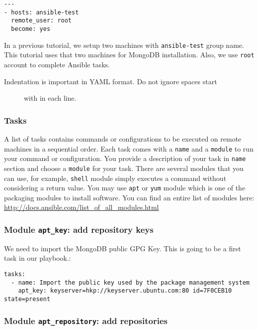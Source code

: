 \begin{verbatim}
---
- hosts: ansible-test
  remote_user: root
  become: yes
\end{verbatim}

In a previous tutorial, we setup two machines with \texttt{ansible-test}
group name. This tutorial uses that two machines for MongoDB
installation. Also, we use \texttt{root} account to complete Ansible
tasks.

\begin{description}
\item[Indentation is important in YAML format. Do not ignore spaces
start]
with in each line.
\end{description}

\subsubsection{Tasks}\label{tasks}

A list of tasks contains commands or configurations to be executed on
remote machines in a sequential order. Each task comes with a
\texttt{name} and a \texttt{module} to run your command or
configuration. You provide a description of your task in \texttt{name}
section and choose a \texttt{module} for your task. There are several
modules that you can use, for example, \texttt{shell} module simply
executes a command without considering a return value. You may use
\texttt{apt} or \texttt{yum} module which is one of the packaging
modules to install software. You can find an entire list of modules
here: \url{http://docs.ansible.com/list_of_all_modules.html}

\subsubsection{\texorpdfstring{Module \texttt{apt\_key}: add repository
keys}{Module apt\_key: add repository keys}}\label{module-apt_key-add-repository-keys}

We need to import the MongoDB public GPG Key. This is going to be a
first task in our playbook.:

\begin{verbatim}
tasks:
  - name: Import the public key used by the package management system
    apt_key: keyserver=hkp://keyserver.ubuntu.com:80 id=7F0CEB10 state=present
\end{verbatim}

\subsubsection{\texorpdfstring{Module \texttt{apt\_repository}: add
repositories}{Module apt\_repository: add repositories}}\label{module-apt_repository-add-repositories}

